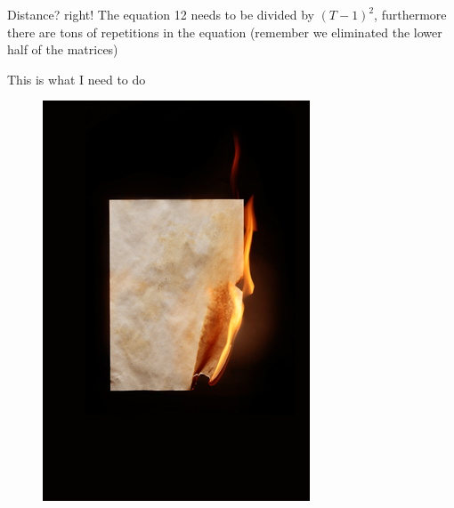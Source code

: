 \documentclass{beamer}
\begin{document}
\begin{frame}{Distance? right!}
	The equation 12 needs to be divided by $(T-1)^2$, furthermore there are tons of repetitions in the equation (remember we eliminated the lower half of the matrices)
\end{frame}

\begin{frame}{This is what I need to do}
\begin{figure}[h]
	\centering
		\includegraphics[scale=1.4]{../Figures/main_idea.jpeg}
\end{figure}	
\end{frame}	
	
\end{document}
